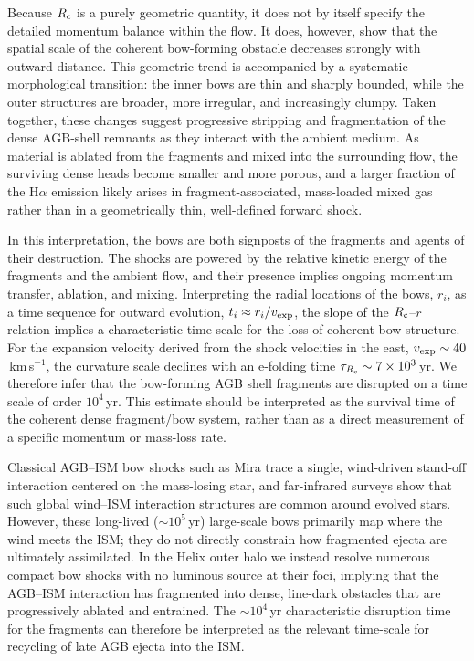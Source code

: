 \documentclass{nature_arxiv}
\newcommand{\kms}{km\,s$^{-1}$}
\begin{document}
Because $R_{\rm c}$ is a purely geometric quantity, it does not by itself specify
the detailed momentum balance within the flow.
It does, however, show that the spatial scale of the coherent bow-forming obstacle
decreases strongly with outward distance.
This geometric trend is accompanied by a systematic morphological transition:
the inner bows are thin and sharply bounded, while the outer structures are broader,
more irregular, and increasingly clumpy.
Taken together, these changes suggest progressive stripping and fragmentation of
the dense AGB-shell remnants as they interact with the ambient medium.
As material is ablated from the fragments and mixed into the surrounding flow,
the surviving dense heads become smaller and more porous, and a larger fraction of
the H$\alpha$ emission likely arises in fragment-associated, mass-loaded mixed gas
rather than in a geometrically thin, well-defined forward shock.\cite{Hartquist1986,Pittard2001,klein:94}

In this interpretation, the bows are both signposts of the fragments and agents
of their destruction.
The shocks are powered by the relative kinetic energy of the fragments and the ambient flow,
and their presence implies ongoing momentum transfer, ablation, and mixing.\cite{Hartquist1986,klein:94}
Interpreting the radial locations of the bows, $r_i$, as a time sequence for outward
evolution, $t_i \approx r_i/v_{\rm exp}$,
the slope of the $R_{\rm c}$--$r$ relation implies a characteristic time scale for the
loss of coherent bow structure.
For the expansion velocity derived from the shock velocities in the east,
$v_{\rm exp} \sim 40$\,\kms, the curvature scale declines with an e-folding time
$\tau_{R_{\rm c}} \sim 7\times 10^3$\,yr.
We therefore infer that the bow-forming AGB shell fragments are disrupted on a
time scale of order $10^4$\,yr.
This estimate should be interpreted as the survival time of the coherent dense
fragment/bow system, rather than as a direct measurement of a specific momentum
or mass-loss rate.



Classical AGB--ISM bow shocks such as Mira trace a single, wind-driven stand-off interaction centered on the mass-losing star,\cite{Martin2007}
and far-infrared surveys show that such global wind--ISM interaction structures are common around evolved stars.\cite{Cox2012}
However, these long-lived\cite{Martin2007} ($\sim 10^5$\,yr)
large-scale bows primarily map where the wind meets the ISM; they do not directly constrain how fragmented ejecta are ultimately assimilated.
In the Helix outer halo we instead resolve numerous compact bow shocks with no luminous source at their foci, implying that the AGB--ISM interaction has
fragmented into dense, line-dark obstacles that are progressively ablated and entrained. The $\sim 10^4$\,yr characteristic disruption time for the fragments
can therefore be interpreted as the relevant time-scale for recycling of late AGB
ejecta into the ISM.
\end{document}
